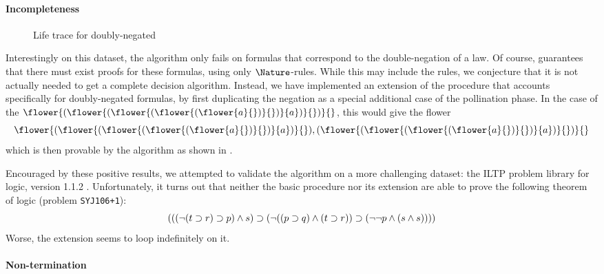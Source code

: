 \begin{scope}
\paragraph{Incompleteness}

\begin{figure*}
  
  \caption{Life trace for doubly-negated }
\end{figure*}

Interestingly on this dataset, the algorithm only fails on formulas that
correspond to the double-negation of a  law. Of course,
 guarantees that there must exist proofs for these
formulas, using only $\Nature$-rules. While this may include the 
rules, we conjecture that it is not actually needed to get a complete decision
algorithm. Instead, we have implemented an extension of the 
procedure that accounts specifically for doubly-negated formulas, by first
duplicating the  negation as a special additional case of the
pollination phase. In the case of the 
$\flower{(\flower{(\flower{(\flower{(\flower{a}{})}{})}{a})}{})}{}$, this would
give the flower
$$\flower{(\flower{(\flower{(\flower{(\flower{a}{})}{})}{a})}{}),
(\flower{(\flower{(\flower{(\flower{a}{})}{})}{a})}{})}{}$$
which is then provable by the algorithm as shown in .

Encouraged by these positive results, we attempted to validate the algorithm on
a more challenging dataset: the ILTP problem library for  logic,
version 1.1.2 . Unfortunately, it turns out that
neither the basic  procedure nor its extension are able to prove
the following theorem of  logic (problem \texttt{SYJ106+1}):
$$(((\neg (t \supset r) \supset p) \land s) \supset (\neg ((p \supset q) \land (t \supset
r)) \supset (\neg \neg p \land (s \land s))))$$
Worse, the extension seems to loop indefinitely on it.

\paragraph{Non-termination}


\end{scope}
